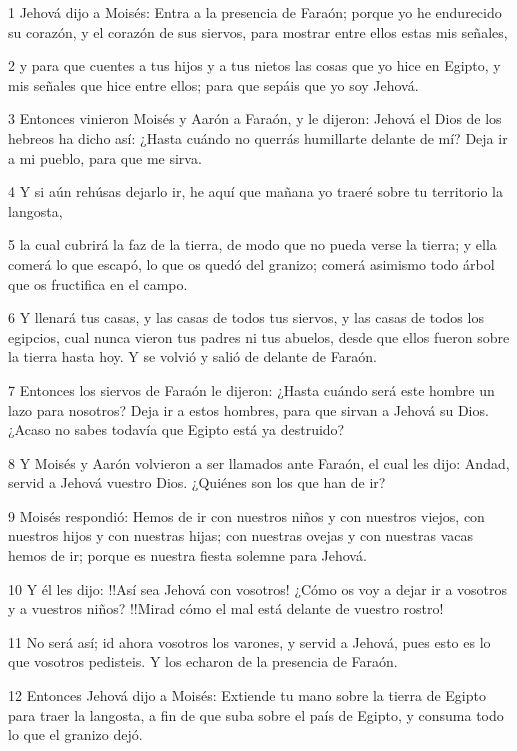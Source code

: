 \par 1 Jehová dijo a Moisés: Entra a la presencia de Faraón; porque yo he endurecido su corazón, y el corazón de sus siervos, para mostrar entre ellos estas mis señales,
\par 2 y para que cuentes a tus hijos y a tus nietos las cosas que yo hice en Egipto, y mis señales que hice entre ellos; para que sepáis que yo soy Jehová.
\par 3 Entonces vinieron Moisés y Aarón a Faraón, y le dijeron: Jehová el Dios de los hebreos ha dicho así: ¿Hasta cuándo no querrás humillarte delante de mí? Deja ir a mi pueblo, para que me sirva.
\par 4 Y si aún rehúsas dejarlo ir, he aquí que mañana yo traeré sobre tu territorio la langosta,
\par 5 la cual cubrirá la faz de la tierra, de modo que no pueda verse la tierra; y ella comerá lo que escapó, lo que os quedó del granizo; comerá asimismo todo árbol que os fructifica en el campo.
\par 6 Y llenará tus casas, y las casas de todos tus siervos, y las casas de todos los egipcios, cual nunca vieron tus padres ni tus abuelos, desde que ellos fueron sobre la tierra hasta hoy. Y se volvió y salió de delante de Faraón.
\par 7 Entonces los siervos de Faraón le dijeron: ¿Hasta cuándo será este hombre un lazo para nosotros? Deja ir a estos hombres, para que sirvan a Jehová su Dios. ¿Acaso no sabes todavía que Egipto está ya destruido?
\par 8 Y Moisés y Aarón volvieron a ser llamados ante Faraón, el cual les dijo: Andad, servid a Jehová vuestro Dios. ¿Quiénes son los que han de ir?
\par 9 Moisés respondió: Hemos de ir con nuestros niños y con nuestros viejos, con nuestros hijos y con nuestras hijas; con nuestras ovejas y con nuestras vacas hemos de ir; porque es nuestra fiesta solemne para Jehová.
\par 10 Y él les dijo: !!Así sea Jehová con vosotros! ¿Cómo os voy a dejar ir a vosotros y a vuestros niños? !!Mirad cómo el mal está delante de vuestro rostro!
\par 11 No será así; id ahora vosotros los varones, y servid a Jehová, pues esto es lo que vosotros pedisteis. Y los echaron de la presencia de Faraón.
\par 12 Entonces Jehová dijo a Moisés: Extiende tu mano sobre la tierra de Egipto para traer la langosta, a fin de que suba sobre el país de Egipto, y consuma todo lo que el granizo dejó.
